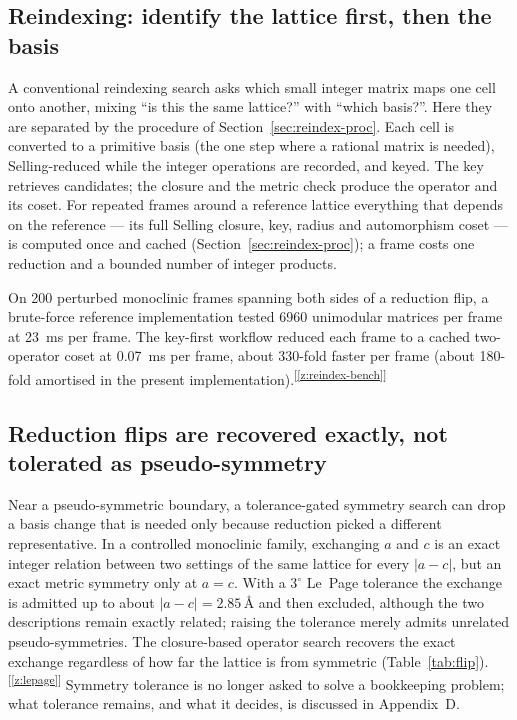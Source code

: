 \documentclass[11pt]{article}
\newcommand{\Ang}{\text{\AA}}
\newcommand{\chk}[1]{\textsuperscript{[\ref{#1}]}}
\begin{document}

\subsection{Reindexing: identify the lattice first, then the basis}

A conventional reindexing search asks which small integer matrix maps one cell onto another, mixing ``is this the same lattice?'' with ``which basis?''. Here they are separated by the procedure of Section~\ref{sec:reindex-proc}. Each cell is converted to a primitive basis (the one step where a rational matrix is needed), Selling-reduced while the integer operations are recorded, and keyed. The key retrieves candidates; the closure and the metric check produce the operator and its coset. For repeated frames around a reference lattice everything that depends on the reference --- its full Selling closure, key, radius and automorphism coset --- is computed once and cached (Section~\ref{sec:reindex-proc}); a frame costs one reduction and a bounded number of integer products.

On 200 perturbed monoclinic frames spanning both sides of a reduction flip, a brute-force reference implementation tested 6960 unimodular matrices per frame at \SI{23}{\milli\second} per frame. The key-first workflow reduced each frame to a cached two-operator coset at \SI{0.07}{\milli\second} per frame, about 330-fold faster per frame (about 180-fold amortised in the present implementation).\chk{z:reindex-bench}

\subsection{Reduction flips are recovered exactly, not tolerated as pseudo-symmetry}

Near a pseudo-symmetric boundary, a tolerance-gated symmetry search can drop a basis change that is needed only because reduction picked a different representative. In a controlled monoclinic family, exchanging $a$ and $c$ is an exact integer relation between two settings of the same lattice for every $|a-c|$, but an exact metric symmetry only at $a=c$. With a $3^\circ$ Le~Page tolerance the exchange is admitted up to about $|a-c|=2.85\,\Ang$ and then excluded, although the two descriptions remain exactly related; raising the tolerance merely admits unrelated pseudo-symmetries. The closure-based operator search recovers the exact exchange regardless of how far the lattice is from symmetric (Table~\ref{tab:flip}).\chk{z:lepage} Symmetry tolerance is no longer asked to solve a bookkeeping problem; what tolerance remains, and what it decides, is discussed in Appendix~D.
\end{document}
